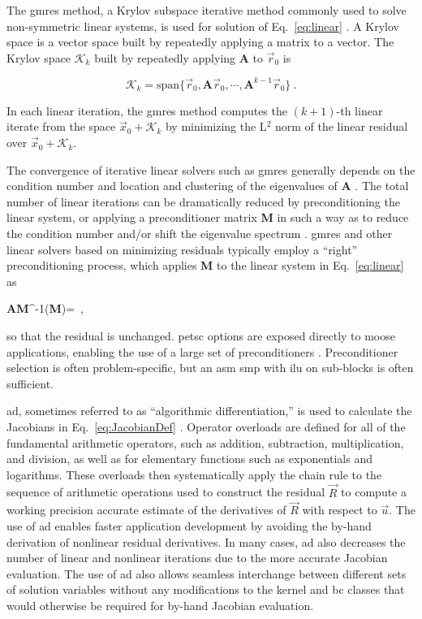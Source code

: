 \noindent The \gls{gmres} method, a Krylov subspace iterative method commonly used to solve non-symmetric linear systems, is used for solution of Eq.\ \eqref{eq:linear} \cite{saad}. A Krylov space is a vector space built by repeatedly applying a matrix to a vector. The Krylov space \(\mathcal{K}_k\) built by repeatedly applying \(\textbf{A}\) to \(\vec{r}_0\) is

\begin{equation}
\label{eq:krylov_space}
\mathcal{K}_k=\textrm{span}\{\vec{r}_0, \textbf{A}\vec{r}_0, \cdots, \textbf{A}^{k-1}\vec{r}_0\}\ .
\end{equation}

\noindent In each linear iteration, the \gls{gmres} method computes the \((k+1)\)-th linear iterate from the space \(\vec{x}_0+\mathcal{K}_k\) by minimizing the L$^2$ norm of the linear residual over \(\vec{x}_0+\mathcal{K}_k\). 

The convergence of iterative linear solvers such as \gls{gmres} generally depends on the condition number and location and clustering of the eigenvalues of \textbf{A} \cite{trefethen}. The total number of linear iterations can be dramatically reduced by preconditioning the linear system, or applying a preconditioner matrix \textbf{M} in such a way as to reduce the condition number and/or shift the eigenvalue spectrum \cite{benzi}. \gls{gmres} and other linear solvers based on minimizing residuals typically employ a ``right'' preconditioning process, which applies \textbf{M} to the linear system in Eq.\ \eqref{eq:linear} as

\beq
\textbf{A}\textbf{M}^{-1}(\textbf{M})=\ ,
\eeq

\noindent so that the residual is unchanged. \gls{petsc} options are exposed directly to \gls{moose} applications, enabling the use of a large set of preconditioners \cite{petsc}. Preconditioner selection is often problem-specific, but an \gls{asm} \gls{smp} with \gls{ilu} on sub-blocks is often sufficient.

\gls{ad}, sometimes referred to as ``algorithmic differentiation,'' is used to calculate the Jacobians in Eq.\ \eqref{eq:JacobianDef} \cite{ad}. Operator overloads are defined for all of the fundamental arithmetic operators, such as addition, subtraction, multiplication, and division, as well as for elementary functions such as exponentials and logarithms. These overloads then systematically apply the chain rule to the sequence of arithmetic operations used to construct the residual \(\vec{R}\) to compute a working precision accurate estimate of the derivatives of \(\vec{R}\) with respect to \(\vec{u}\). The use of \gls{ad} enables faster application development by avoiding the by-hand derivation of nonlinear residual derivatives. In many cases, \gls{ad} also decreases the number of linear and nonlinear iterations due to the more accurate Jacobian evaluation. The use of \gls{ad} also allows seamless interchange between different sets of solution variables without any modifications to the kernel and \gls{bc} classes that would otherwise be required for by-hand Jacobian evaluation.

